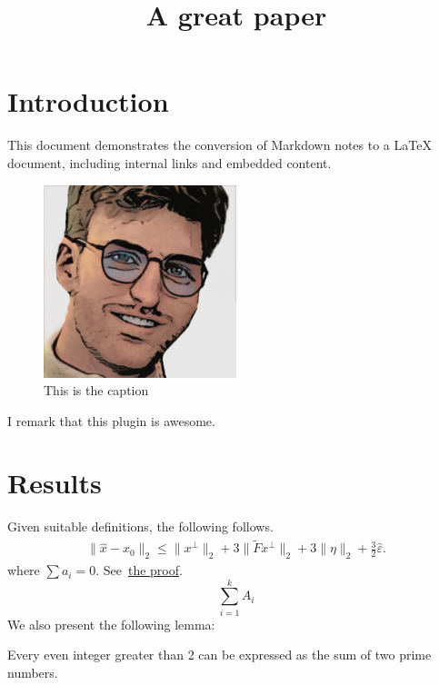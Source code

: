 \documentclass{article}
\title{A great paper}
\begin{document}
\maketitle
{}
\section{Introduction}
\label{sec:introduction}
This document demonstrates the conversion of Markdown notes to a LaTeX document, including internal links and embedded content.
\begin{figure}[h]
\label{download.jpeg}
\centering
\includegraphics[width=0.5\textwidth]{Files/download.jpeg}
\caption{This is the caption}
\end{figure}
\begin{remark}
\label{main_note-statement}
I remark that this plugin is awesome.

\end{remark}

\section{Results}
\label{sec:results}

Given suitable definitions, the following follows.
\begin{align*}
\|\hat x - x_0\|_2
\leq \|x^\perp\|_2 + 3\|\tilde{F}x^\perp\|_2 + 3 \|\eta\|_2 + \frac{3}{2}\hat\varepsilon.
\end{align*}
where $\sum a_i = 0$. See~\hyperlink{lemma_1-proof}{the proof}.
$$\sum_{i=1}^k A_i$$
We also present the following lemma:
\begin{lemma}[lemma 1]
\label{lemma_1-statement}
Every even integer greater than 2 can be expressed as the sum of two prime numbers.
\end{lemma}
\end{document}
